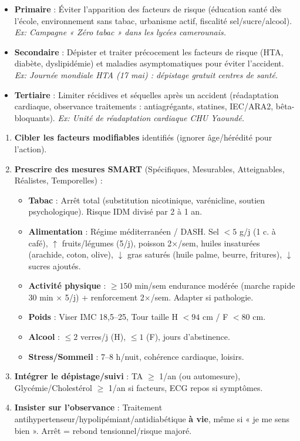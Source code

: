 \documentclass[11pt]{article}
\begin{document}
\begin{propriete}
\begin{itemize}
\item \textbf{Primaire} : Éviter l'apparition des facteurs de risque (éducation santé dès l'école, environnement sans tabac, urbanisme actif, fiscalité sel/sucre/alcool). \emph{Ex: Campagne « Zéro tabac » dans les lycées camerounais.}
\item \textbf{Secondaire} : Dépister et traiter précocement les facteurs de risque (HTA, diabète, dyslipidémie) et maladies asymptomatiques pour éviter l'accident. \emph{Ex: Journée mondiale HTA (17 mai) : dépistage gratuit centres de santé.}
\item \textbf{Tertiaire} : Limiter récidives et séquelles après un accident (réadaptation cardiaque, observance traitements : antiagrégants, statines, IEC/ARA2, bêta-bloquants). \emph{Ex: Unité de réadaptation cardiaque CHU Yaoundé.}
\end{itemize}
\end{propriete}

\begin{methode}
\begin{enumerate}
\item \textbf{Cibler les facteurs modifiables} identifiés (ignorer âge/hérédité pour l'action).
\item \textbf{Prescrire des mesures SMART} (Spécifiques, Mesurables, Atteignables, Réalistes, Temporelles) :
\begin{itemize}
\item \textbf{Tabac} : Arrêt total (substitution nicotinique, varénicline, soutien psychologique). Risque IDM divisé par 2 à 1 an.
\item \textbf{Alimentation} : Régime méditerranéen / DASH. Sel $< 5$ g/j (1 c. à café), $\uparrow$ fruits/légumes (5/j), poisson 2$\times$/sem, huiles insaturées (arachide, coton, olive), $\downarrow$ gras saturés (huile palme, beurre, fritures), $\downarrow$ sucres ajoutés.
\item \textbf{Activité physique} : $\geq 150$ min/sem endurance modérée (marche rapide 30 min $\times$ 5/j) + renforcement 2$\times$/sem. Adapter si pathologie.
\item \textbf{Poids} : Viser IMC 18,5--25, Tour taille H $< 94$ cm / F $< 80$ cm.
\item \textbf{Alcool} : $\leq 2$ verres/j (H), $\leq 1$ (F), jours d'abstinence.
\item \textbf{Stress/Sommeil} : 7--8 h/nuit, cohérence cardiaque, loisirs.
\end{itemize}
\item \textbf{Intégrer le dépistage/suivi} : TA $\geq$ 1/an (ou automesure), Glycémie/Cholestérol $\geq$ 1/an si facteurs, ECG repos si symptômes.
\item \textbf{Insister sur l'observance} : Traitement antihypertenseur/hypolipémiant/antidiabétique \textbf{à vie}, même si « je me sens bien ». Arrêt = rebond tensionnel/risque majoré.
\end{enumerate}
\end{methode}
\end{document}
